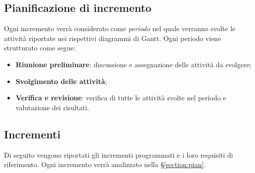 \documentclass[../piano-di-progetto.tex]{subfiles}
\begin{document}
  \subsection{Pianificazione di incremento}
  Ogni incremento verrà considerato come \emph{periodo} nel quale verranno svolte le attività riportate nei rispettivi diagrammi di Gantt. Ogni periodo viene strutturato come segue:
  \begin{itemize}
      \item \textbf{Riunione preliminare}: discussione e assegnazione delle attività da svolgere;
      \item \textbf{Svolgimento delle attività};
      \item \textbf{Verifica e revisione}: verifica di tutte le attività svolte nel periodo e valutazione dei risultati. 
  \end{itemize}

  \subsection{Incrementi}
  Di seguito vengono riportati gli incrementi programmati e i loro requisiti di riferimento. Ogni incremento verrà analizzato nella \S\ref{section:pian}.
\end{document}

